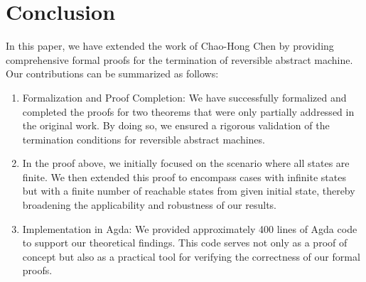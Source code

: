 \chapter{Conclusion}
\label{chapter:fig}

In this paper, we have extended the work of Chao-Hong Chen by providing comprehensive formal proofs for the termination of reversible abstract machine.  Our contributions can be summarized as follows:
\begin{enumerate}[1.]
    \item Formalization and Proof Completion: We have successfully formalized and completed the proofs for two theorems that were only partially addressed in the original work. By doing so, we ensured a rigorous validation of the termination conditions for reversible abstract machines.
    \item In the proof above, we initially focused on the scenario where all states are finite.  We then extended this proof to encompass cases with infinite states but with a finite number of reachable states from given initial state, thereby broadening the applicability and robustness of our results.
    \item Implementation in Agda: We provided approximately 400 lines of Agda code to support our theoretical findings. This code serves not only as a proof of concept but also as a practical tool for verifying the correctness of our formal proofs.
\end{enumerate}

